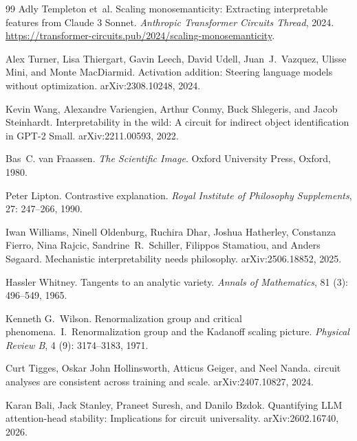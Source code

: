 \documentclass{article}
\begin{document}
\begin{thebibliography}{99}
Adly Templeton et~al.
\newblock Scaling monosemanticity: Extracting interpretable features from
  {Claude 3 Sonnet}.
\newblock \emph{Anthropic Transformer Circuits Thread}, 2024.
\newblock \url{https://transformer-circuits.pub/2024/scaling-monosemanticity}.

Alex Turner, Lisa Thiergart, Gavin Leech, David Udell, Juan~J.\ Vazquez,
  Ulisse Mini, and Monte MacDiarmid.
\newblock Activation addition: Steering language models without optimization.
\newblock arXiv:2308.10248, 2024.

Kevin Wang, Alexandre Variengien, Arthur Conmy, Buck Shlegeris, and Jacob
  Steinhardt.
\newblock Interpretability in the wild: A circuit for indirect object
  identification in {GPT-2 Small}.
\newblock arXiv:2211.00593, 2022.

Bas~C. van Fraassen.
\newblock \emph{The Scientific Image}.
\newblock Oxford University Press, Oxford, 1980.

Peter Lipton.
\newblock Contrastive explanation.
\newblock \emph{Royal Institute of Philosophy Supplements}, 27:
  247--266, 1990.

Iwan Williams, Ninell Oldenburg, Ruchira Dhar, Joshua Hatherley, Constanza
  Fierro, Nina Rajcic, Sandrine~R.\ Schiller, Filippos Stamatiou, and Anders
  S{\o}gaard.
\newblock Mechanistic interpretability needs philosophy.
\newblock arXiv:2506.18852, 2025.

Hassler Whitney.
\newblock Tangents to an analytic variety.
\newblock \emph{Annals of Mathematics}, 81 (3): 496--549, 1965.

Kenneth G.\ Wilson.
\newblock Renormalization group and critical phenomena.\ {I}.\ Renormalization
  group and the {Kadanoff} scaling picture.
\newblock \emph{Physical Review B}, 4 (9): 3174--3183, 1971.

Curt Tigges, Oskar John Hollinsworth, Atticus Geiger, and Neel Nanda.
 circuit analyses are consistent across training and scale.
\newblock arXiv:2407.10827, 2024.

Karan Bali, Jack Stanley, Praneet Suresh, and Danilo Bzdok.
\newblock Quantifying {LLM} attention-head stability: Implications for circuit
  universality.
\newblock arXiv:2602.16740, 2026.


\end{thebibliography}
\end{document}
